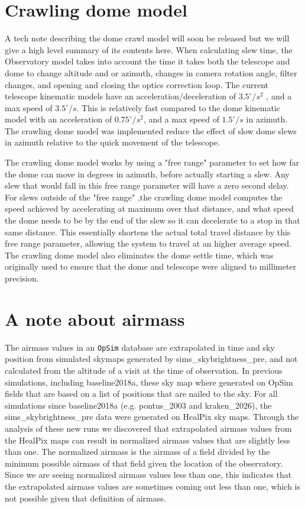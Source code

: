 \documentclass[DM,lsstdraft,authoryear,toc]{lsstdoc}
\newcommand{\opsim}{\texttt{OpSim}\xspace}
\begin{document}
\section{Crawling dome model}

A tech note describing the dome crawl model will soon be released but we will give a high 
level summary of its contents here. When calculating slew time, the Observatory model takes
into account the time it takes both the telescope and dome to change altitude and or azimuth,
changes in camera rotation angle, filter changes, and opening and closing the optics correction loop.
The current telescope kinematic models have an acceleration/deceleration of $3.5^{\circ}/s^{2}$ , 
and a max speed of $3.5^{\circ}/s$. This is relatively fast compared to the dome kinematic model with
an acceleration of $0.75^{\circ}/s^{2}$, and a max speed of $1.5^{\circ}/s$ in azimuth. The crawling dome 
model was implemented reduce the effect of slow dome slews in azimuth relative to the quick movement of the telescope.

The crawling dome model works by using a "free range" parameter to set how far the dome can move in degrees in
azimuth, before actually starting a slew. Any slew that would fall in this free range parameter will have a 
zero second delay. For slews outside of the "free range" ,the crawling dome model computes the speed
achieved by accelerating at maximum over that distance, and what speed the dome needs to be by the
end of the slew so it can decelerate to a stop in that same distance.  This essentially shortens the actual
total travel distance by this free range parameter, allowing the system to travel at an higher average speed.
The crawling dome model also eliminates the dome settle time, which was originally used to ensure that the
dome and telescope were aligned to millimeter precision.   

\section{A note about airmass}

The airmass values in an \opsim database are extrapolated in time and sky position from simulated skymaps generated
by sims\_skybrightness\_pre, and not calculated from the altitude of a visit at the time of observation. 
In previous simulations, including baseline2018a, these sky map where generated on OpSim fields that are
based on a list of positions that are nailed to the sky. For all simulations since baseline2018a 
(e.g. pontus\_2003 and kraken\_2026), the sims\_skybrightness\_pre data were generated on HealPix
sky maps. Through the analysis of these new runs we discovered that extrapolated airmass values 
from the HealPix maps can result in normalized airmass values that are slightly less than one. The normalized
airmass is the airmass of a field divided by the minimum possible airmass of that field given the location
of the observatory. Since we are seeing normalized airmass values less than one, this indicates that the
extrapolated airmass values are sometimes coming out less than one, which is not possible given that definition of airmass.
\end{document}
